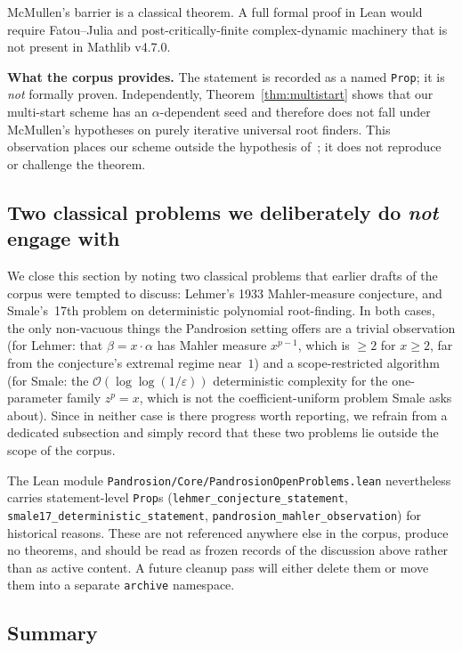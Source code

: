 \documentclass[11pt,a4paper]{article}
\theoremstyle{definition}
\theoremstyle{remark}
\begin{document}
McMullen's barrier is a classical theorem. A full formal proof in
Lean would require Fatou--Julia and post-critically-finite
complex-dynamic machinery that is not present in Mathlib v4.7.0.

\smallskip

\textbf{What the corpus provides.} The statement is recorded as a
named \texttt{Prop}; it is \emph{not} formally proven.
Independently, Theorem~\ref{thm:multistart} shows that our multi-start
scheme has an $\alpha$-dependent seed and therefore does not fall
under McMullen's hypotheses on purely iterative universal root
finders. This observation places our scheme outside the hypothesis
of~\cite{mcmullen}; it does not reproduce or challenge the theorem.

\subsection{Two classical problems we deliberately do \emph{not} engage with}

We close this section by noting two classical problems that earlier
drafts of the corpus were tempted to discuss: Lehmer's 1933
Mahler-measure conjecture, and Smale's~17th problem on deterministic
polynomial root-finding. In both cases, the only non-vacuous things
the Pandrosion setting offers are a trivial observation (for Lehmer:
that $\beta = x \cdot \alpha$ has Mahler measure $x^{p-1}$, which is
$\geq 2$ for $x \geq 2$, far from the conjecture's extremal regime
near~$1$) and a scope-restricted algorithm (for Smale: the
$\mathcal{O}(\log\log(1/\varepsilon))$ deterministic complexity for
the one-parameter family $z^p = x$, which is not the
coefficient-uniform problem Smale asks about). Since in neither case
is there progress worth reporting, we refrain from a dedicated
subsection and simply record that these two problems lie outside the
scope of the corpus.

The Lean module
\texttt{Pandrosion/Core/PandrosionOpenProblems.lean}
nevertheless carries statement-level \texttt{Prop}s
(\texttt{lehmer\_conjecture\_statement},
\texttt{smale17\_deterministic\_statement},
\texttt{pandrosion\_mahler\_observation}) for historical reasons. These
are not referenced anywhere else in the corpus, produce no theorems,
and should be read as frozen records of the discussion above rather
than as active content. A future cleanup pass will either delete them
or move them into a separate \texttt{archive} namespace.

\subsection{Summary}
\end{document}
